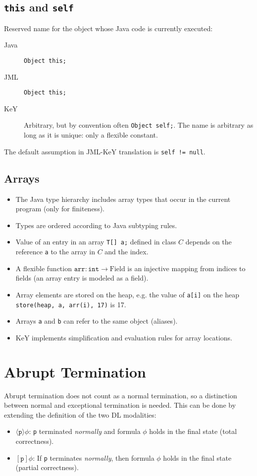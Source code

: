 \documentclass[a4paper, 11pt, accentcolor = tud3b]{tudreport}
\begin{document}
			\subsection{\texttt{this} and \texttt{self}}
				Reserved name for the object whose Java code is currently executed:
				\begin{description}
					\item[Java] \texttt{Object this;}
					\item[JML]  \texttt{Object this;}
					\item[KeY]  Arbitrary, but by convention often \texttt{Object self;}. The name is arbitrary as long as it is unique: only a flexible constant.
				\end{description}
				The default assumption in JML-KeY translation is \texttt{self != null}.
			
			\subsection{Arrays}
				\begin{itemize}
					\item The Java type hierarchy includes array types that occur in the current program (only for finiteness).
					\item Types are ordered according to Java subtyping rules.
					\item Value of an entry in an array \texttt{T[] a;} defined in class \(C\) depends on the reference \texttt{a} to the array in \(C\) and the index.
					\item A flexible function \( \texttt{arr} : \texttt{int} \to \textrm{Field} \) is an injective mapping from indices to fields (an array entry is modeled as a field).
					\item Array elements are stored on the heap, e.g. the value of \texttt{a[i]} on the heap \texttt{store(heap, a, arr(i), 17)} is 17.
					\item Arrays \texttt{a} and \texttt{b} can refer to the same object (aliases).
					\item KeY implements simplification and evaluation rules for array locations.
				\end{itemize}
		
		\section{Abrupt Termination}
			Abrupt termination does not count as a normal termination, so a distinction between normal and exceptional termination is needed. This can be done by extending the definition of the two DL modalities:
			\begin{itemize}
				\item \( \langle \texttt{p} \rangle \phi \): \texttt{p} terminated \textit{normally} and formula \(\phi\) holds in the final state (total correctness).
				\item \( [\texttt{p}] \phi \): If \texttt{p} terminates \textit{normally}, then formula \(\phi\) holds in the final state (partial correctness).
			\end{itemize}
		
\end{document}

